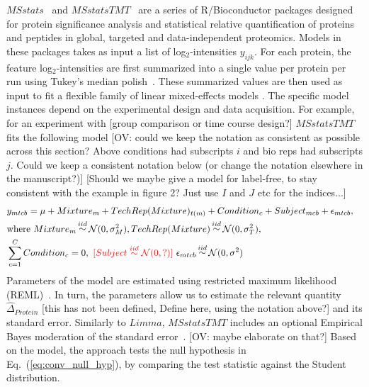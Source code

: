 \documentclass[mcp]{article}
\numberwithin{table}{section}
\def\todo#1{{\color{red}[#1]}}
\def\eqref#1{Eq.~(\ref{eq:#1})}
\begin{document}
$MSstats$~\cite{Choi:2014} and $MSstatsTMT$~\cite{Huang:2020} are a series of R/Bioconductor packages designed for protein significance analysis and statistical relative quantification of proteins and peptides in global, targeted and data-independent proteomics. Models in these packages takes as input a list of log$_2$-intensities $y_{ijk}$. For each protein, the feature log$_2$-intensities are first summarized into a single value per protein per run using Tukey's median polish~\cite{Tukey:1977}. These summarized values are then used as input to fit a flexible family of linear mixed-effects models \cite{McLean:1991, Faraway:2006, Bolker2009}. The specific model instances depend on the experimental design and data acquisition. For example, for an experiment with \todo{group comparison or time course design?} $MSstatsTMT$ fits the following model \todo{OV: could we keep the notation as consistent as possible across this section? Above conditions had subscripts $i$ and bio reps had subscripts $j$. Could we keep a consistent notation below (or change the notation elsewhere in the manuscript?)} \todo{Should we maybe give a model for label-free, to stay consistent with the example in figure 2? Just use $I$ and $J$ etc for the indices...}
\begin{eqnarray}
& y_{mtcb} = \mu + Mixture_m + TechRep(Mixture)_{t(m)} + Condition_c + Subject_{mcb} + \epsilon_{mtcb}, & \\ 
& \text{where }  Mixture_m  \mathop\sim^{iid} \mathcal{N}(0, \sigma^2_M),  TechRep(Mixture) \mathop\sim^{iid} \mathcal{N}(0, \sigma^2_T), &  \nonumber \\
& \sum\limits_{c=1}^{C} Condition_c = 0,\ \todo{Subject \stackrel{iid}{\sim}\mathcal{N}(0,?)}\  \epsilon_{mtcb} \mathop\sim^{iid} \mathcal{N}(0, \sigma^2) & \nonumber
\end{eqnarray}
Parameters of the model are estimated using restricted maximum likelihood (REML)~\cite{Kenward}.
In turn, the parameters allow us to estimate the relevant quantity $\hat{\Delta}_{Protein}$ \todo{this has not been defined, Define here, using the notation above?} and its standard error.
Similarly to $Limma$, $MSstatsTMT$ includes an optional Empirical Bayes moderation of the standard error~\cite{Huang:2020}. 
\todo{OV: maybe elaborate on that?} Based on the model, the approach tests the null hypothesis in \eqref{conv_null_hyp}, by comparing the test statistic against the Student distribution.
\end{document}
